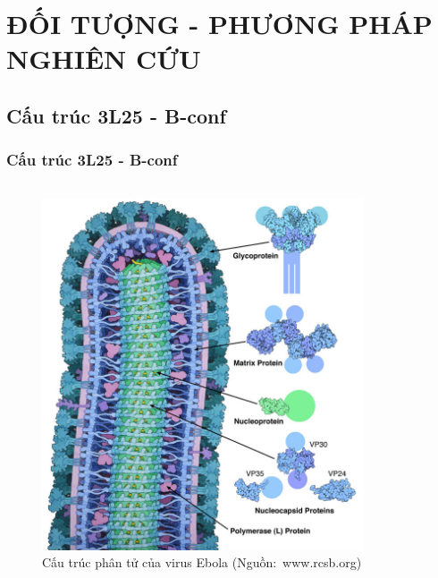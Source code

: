 \documentclass[10pt]{beamer}
\begin{document}
\section{ĐỐI TƯỢNG - PHƯƠNG PHÁP NGHIÊN CỨU}
\subsection{Cấu trúc 3L25 - B-conf}
	\begin{frame}
	\frametitle{Cấu trúc 3L25 - B-conf}
		\begin{columns}
			\begin{column}{0.5\textwidth}
			\begin{figure}[h]
					\centering
					\includegraphics[height=0.6\textheight,natwidth=610,natheight=642]{../virion}
					\caption{Cấu trúc phân tử của virus Ebola \mbox{(Nguồn: www.rcsb.org)}}
			\end{figure}
			\end{column}
			\begin{column}{0.5\textwidth}
				\begin{figure}

\end{figure}
\end{column}
\end{columns}
\end{frame}
\end{document}
